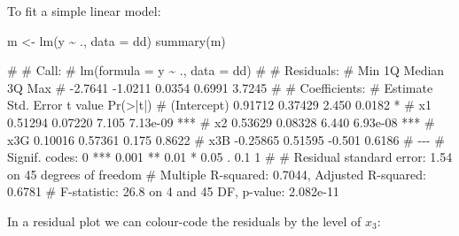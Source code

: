 \documentclass[
  a4paper,
]{article}
\newenvironment{Shaded}{\begin{snugshade}}{\end{snugshade}}
\newcommand{\AttributeTok}[1]{\textcolor[rgb]{0.77,0.63,0.00}{#1}}
\newcommand{\DecValTok}[1]{\textcolor[rgb]{0.00,0.00,0.81}{#1}}
\newcommand{\FunctionTok}[1]{\textcolor[rgb]{0.00,0.00,0.00}{#1}}
\newcommand{\NormalTok}[1]{#1}
\newcommand{\OtherTok}[1]{\textcolor[rgb]{0.56,0.35,0.01}{#1}}
\newcommand{\SpecialCharTok}[1]{\textcolor[rgb]{0.00,0.00,0.00}{#1}}
\newcommand{\StringTok}[1]{\textcolor[rgb]{0.31,0.60,0.02}{#1}}
\theoremstyle{definition}
\theoremstyle{definition}
\theoremstyle{definition}
\theoremstyle{definition}
\theoremstyle{remark}
\begin{document}
\begin{myanswers}
To fit a simple linear model:

\begin{Shaded}
\begin{Highlighting}[]
\NormalTok{m }\OtherTok{\textless{}{-}} \FunctionTok{lm}\NormalTok{(y }\SpecialCharTok{\textasciitilde{}}\NormalTok{ ., }\AttributeTok{data =}\NormalTok{ dd)}
\FunctionTok{summary}\NormalTok{(m)}
\end{Highlighting}
\end{Shaded}

\begin{Shaded}
\begin{Highlighting}[]
\NormalTok{\# }
\NormalTok{\# Call:}
\NormalTok{\# lm(formula = y \textasciitilde{} ., data = dd)}
\NormalTok{\# }
\NormalTok{\# Residuals:}
\NormalTok{\#     Min      1Q  Median      3Q     Max }
\NormalTok{\# {-}2.7641 {-}1.0211  0.0354  0.6991  3.7245 }
\NormalTok{\# }
\NormalTok{\# Coefficients:}
\NormalTok{\#             Estimate Std. Error t value Pr(\textgreater{}|t|)    }
\NormalTok{\# (Intercept)  0.91712    0.37429   2.450   0.0182 *  }
\NormalTok{\# x1           0.51294    0.07220   7.105 7.13e{-}09 ***}
\NormalTok{\# x2           0.53629    0.08328   6.440 6.93e{-}08 ***}
\NormalTok{\# x3G          0.10016    0.57361   0.175   0.8622    }
\NormalTok{\# x3B         {-}0.25865    0.51595  {-}0.501   0.6186    }
\NormalTok{\# {-}{-}{-}}
\NormalTok{\# Signif. codes:  0 \textquotesingle{}***\textquotesingle{} 0.001 \textquotesingle{}**\textquotesingle{} 0.01 \textquotesingle{}*\textquotesingle{} 0.05 \textquotesingle{}.\textquotesingle{} 0.1 \textquotesingle{} \textquotesingle{} 1}
\NormalTok{\# }
\NormalTok{\# Residual standard error: 1.54 on 45 degrees of freedom}
\NormalTok{\# Multiple R{-}squared:  0.7044,  Adjusted R{-}squared:  0.6781 }
\NormalTok{\# F{-}statistic:  26.8 on 4 and 45 DF,  p{-}value: 2.082e{-}11}
\end{Highlighting}
\end{Shaded}

In a residual plot we can colour-code the residuals by the level of \(x_3\):

\begin{Shaded}
\end{Shaded}


\end{myanswers}
\end{document}
